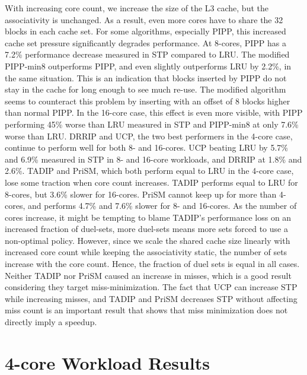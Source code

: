 With increasing core count, we increase the size of the L3 cache, but the associativity is unchanged.
As a result, even more cores have to share the 32 blocks in each cache set.
For some algorithms, especially PIPP, this increased cache set pressure significantly degrades performance.
At 8-cores, PIPP has a 7.2\% performance decrease measured in STP compared to LRU.
The modified PIPP-min8 outperforms PIPP, and even slightly outperforms LRU by 2.2\%, in the same situation.
This is an indication that blocks inserted by PIPP do not stay in the cache for long enough to see much re-use.
The modified algorithm seems to counteract this problem by inserting with an offset of 8 blocks higher than normal PIPP.
In the 16-core case, this effect is even more visible, with PIPP performing 45\% worse than LRU measured in STP and PIPP-min8 at only 7.6\% worse than LRU.
DRRIP and UCP, the two best performers in the 4-core case, continue to perform well for both 8- and 16-cores.
UCP beating LRU by 5.7\% and 6.9\% measured in STP in 8- and 16-core workloads, and DRRIP at 1.8\% and 2.6\%.
TADIP and PriSM, which both perform equal to LRU in the 4-core case, lose some traction when core count increases.
TADIP performs equal to LRU for 8-cores, but 3.6\% slower for 16-cores.
PriSM cannot keep up for more than 4-cores, and performs 4.7\% and 7.6\% slower for 8- and 16-cores.
As the number of cores increase, it might be tempting to blame TADIP's performance loss on an increased fraction of duel-sets, more duel-sets means more sets forced to use a non-optimal policy.
However, since we scale the shared cache size linearly with increased core count while keeping the associativity static, the number of sets increase with the core count.
Hence, the fraction of duel sets is equal in all cases.
Neither TADIP nor PriSM caused an increase in misses, which is a good result considering they target miss-minimization.
The fact that UCP can increase STP while increasing misses, and TADIP and PriSM decreases STP without affecting miss count is an important result that shows that miss minimization does not directly imply a speedup.


\section{4-core Workload Results}

